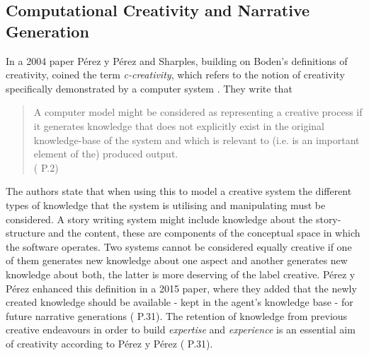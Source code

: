 \documentclass[letterpaper]{article}
\begin{document}

\subsection{Computational Creativity and Narrative Generation} %

In a 2004 paper P\'erez y P\'erez and Sharples, building on Boden's definitions of creativity, coined the term \emph{c-creativity}, which refers to the notion of creativity specifically demonstrated by a computer system . They write that
\begin{quote}
A computer model might be considered as representing a creative process if it generates knowledge that does not explicitly exist in the original knowledge-base of the system and which is relevant to (i.e. is an important element of the) produced output.\\
( P.2)
\end{quote} %
The authors state that when using this to model a creative system the different types of knowledge that the system is utilising and manipulating must be considered. A story writing system might include knowledge about the story-structure and the content, these are components of the conceptual space in which the software operates. Two systems cannot be considered equally creative if one of them generates new knowledge about one aspect and another generates new knowledge about both, the latter is more deserving of the label creative. P\'erez y P\'erez enhanced this definition in a 2015 paper, where they added that the newly created knowledge should be available - kept in the agent's knowledge base - for future narrative generations ( P.31). The retention of knowledge from previous creative endeavours in order to build \emph{expertise} and \emph{experience} is an essential aim of creativity according to P\'erez y P\'erez ( P.31).\\
\end{document}
